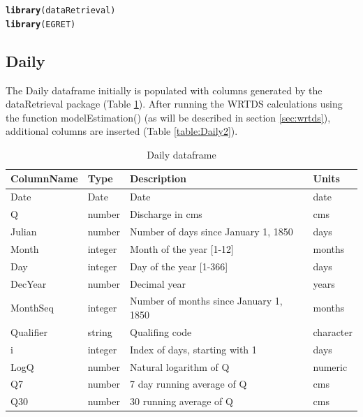 \documentclass[a4paper,11pt]{article}\usepackage[]{graphicx}\usepackage[]{color}
\makeatletter
\newcommand{\hlstd}[1]{\textcolor[rgb]{0.345,0.345,0.345}{#1}}%
\newcommand{\hlkwd}[1]{\textcolor[rgb]{0.737,0.353,0.396}{\textbf{#1}}}%
\newenvironment{kframe}{%
 \def\at@end@of@kframe{}%
 \ifinner\ifhmode%
  \def\at@end@of@kframe{\end{minipage}}%
  \begin{minipage}{\columnwidth}%
 \fi\fi%
 \def\FrameCommand##1{\hskip\@totalleftmargin \hskip-\fboxsep
 \colorbox{shadecolor}{##1}\hskip-\fboxsep
     \hskip-\linewidth \hskip-\@totalleftmargin \hskip\columnwidth}%
 \MakeFramed {\advance\hsize-\width
   \@totalleftmargin\z@ \linewidth\hsize
   \@setminipage}}%
 {\par\unskip\endMakeFramed%
 \at@end@of@kframe}
\newenvironment{knitrout}{}{} %
\makeatother
\begin{document}
\begin{knitrout}
\color{fgcolor}\begin{kframe}
\begin{alltt}
\hlkwd{library}\hlstd{(dataRetrieval)}
\hlkwd{library}\hlstd{(EGRET)}
\end{alltt}
\end{kframe}
\end{knitrout}

\subsection{Daily}
\label{sec:dataframesDaily}
The Daily dataframe initially is populated with columns generated by the dataRetrieval package (Table \ref{table:Daily1}).  After running the WRTDS calculations using the function modelEstimation() (as will be described in section \ref{sec:wrtds}), additional columns are inserted (Table \ref{table:Daily2}).

\begin{table}[!ht]
\centering
\caption{Daily dataframe} 
\label{table:Daily1}
\begin{tabular}{llll}
  \hline
ColumnName & Type & Description & Units \\ 
  \hline
  Date & Date & Date & date \\ 
  Q & number & Discharge in cms & cms \\ 
  Julian & number & Number of days since January 1, 1850 & days \\ 
  Month & integer & Month of the year [1-12] & months \\ 
  Day & integer & Day of the year [1-366] & days \\ 
  DecYear & number & Decimal year & years \\ 
  MonthSeq & integer & Number of months since January 1, 1850 & months \\ 
  Qualifier & string & Qualifing code & character \\ 
  i & integer & Index of days, starting with 1 & days \\ 
  LogQ & number & Natural logarithm of Q & numeric \\ 
  Q7 & number & 7 day running average of Q & cms \\ 
  Q30 & number & 30 running average of Q & cms \\ 
   \hline
\end{tabular}
\end{table}
\end{document}
